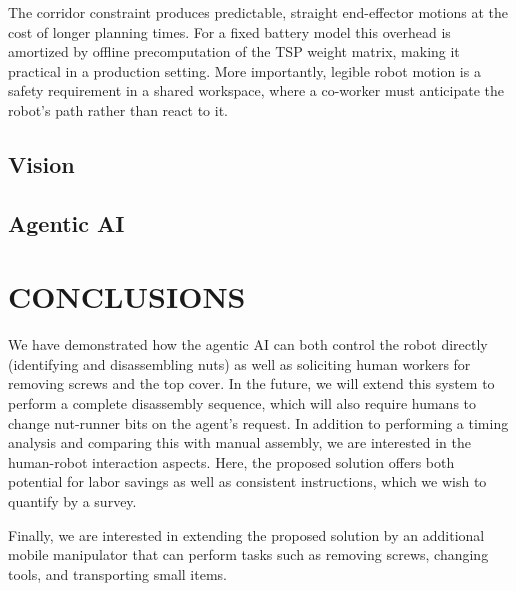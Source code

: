 \documentclass[letterpaper, 10 pt, conference]{ieeeconf}  %
\begin{document}
The corridor constraint produces predictable, straight end-effector motions at
the cost of longer planning times. For a fixed battery model this overhead is
amortized by offline precomputation of the TSP weight matrix, making it
practical in a production setting. More importantly, legible robot motion is a
safety requirement in a shared workspace, where a co-worker must
anticipate the robot's path rather than react to it.
\subsection{Vision}
\subsection{Agentic AI}

\section{CONCLUSIONS}

We have demonstrated how the agentic AI can both control the robot directly (identifying and disassembling nuts) as well as soliciting human workers for removing screws and the top cover. In the future, we will extend this system to perform a complete disassembly sequence, which will also require humans to change nut-runner bits on the agent's request. In addition to performing a timing analysis and comparing this with manual assembly, we are interested in the human-robot interaction aspects. Here, the proposed solution offers both potential for labor savings as well as consistent instructions, which we wish to quantify by a survey.

Finally, we are interested in extending the proposed solution by an additional mobile manipulator that can perform tasks such as removing screws, changing tools, and transporting small items. 

\addtolength{\textheight}{-12cm}   %

\end{document}
